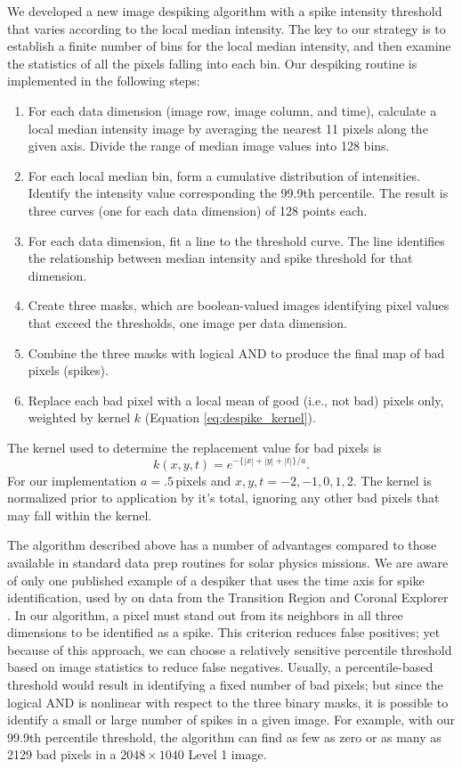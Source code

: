 We developed a new image despiking algorithm with a spike intensity threshold that varies according to the local median intensity. The key to our strategy is to establish a finite number of bins for the local median intensity, and then examine the statistics of all the pixels falling into each bin. Our despiking routine is implemented in the following steps:
\begin{enumerate}
	\item For each data dimension (image row, image column, and time), calculate a local median intensity image by averaging the nearest 11 pixels along the given axis. Divide the range of median image values into 128 bins.
	\item For each local median bin, form a cumulative distribution of intensities. Identify the intensity value corresponding the 99.9th percentile. The result is three curves (one for each data dimension) of 128 points each. 
	\item For each data dimension, fit a line to the threshold curve. The line identifies the relationship between median intensity and spike threshold for that dimension.
	\item Create three masks, which are  boolean-valued images identifying pixel values that exceed the thresholds, one image per data dimension.
	\item Combine the three masks with logical AND to produce the final map of bad pixels (spikes). 
	\item Replace each bad pixel with a local mean of good (i.e., not bad) pixels only, weighted by kernel $k$ (Equation \ref{eq:despike_kernel}).
\end{enumerate}
The kernel used to determine the replacement value for bad pixels is
\begin{equation} \label{eq:despike_kernel}
k(x,y,t) = e^{-\lbrace|x|+|y|+|t|\rbrace/a}.
\end{equation}
For our implementation $a=.5$\,pixels and $x,y,t= -2, -1, 0, 1 , 2$.
The kernel is normalized prior to application by it's total, ignoring any other bad pixels that may fall within the kernel.

The algorithm described above has a number of advantages compared to those available in standard data prep routines for solar physics missions. 
We are aware of only one published example of a despiker that uses the time axis for spike identification, used by \citet{Aschwanden2000(trace_unspike_time)} on data from the Transition Region and Coronal Explorer \citep[TRACE]{handy1999}. 
In our algorithm, a pixel must stand out from its neighbors in all three dimensions to be identified as a spike.
This criterion reduces false positives; yet because of this approach, we can choose a relatively sensitive percentile threshold based on image statistics to reduce false negatives. 
Usually, a percentile-based threshold would result in identifying a fixed number of bad pixels; but since the logical AND is nonlinear with respect to the three binary masks, it is possible to identify a small or large number of spikes in a given image. 
For example, with our 99.9th percentile threshold, the algorithm can find as few as zero or as many as 2129 bad pixels in a $2048\times 1040$ Level 1 image.

